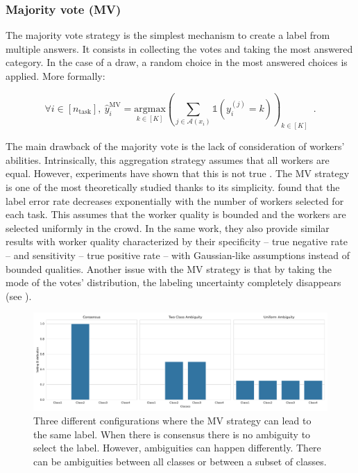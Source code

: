 \subsubsection{Majority vote (MV)}
\label{subsub:mv}

The majority vote strategy is the simplest mechanism to create a label from multiple answers.
It consists in collecting the votes and taking the most answered category.
In the case of a draw, a random choice in the most answered choices is applied.
More formally:

\begin{equation}\label{eq:mv}
    \forall i\in [n_\text{task}],\ \hat y_i^{\mathrm{MV}} = \underset{k\in[K]}{\mathrm{argmax}}\left(\sum_{j\in\mathcal{A}(x_i)} \mathds{1}(y_i^{(j)}=k)\right)_{k\in[K]} \enspace.
\end{equation}

The main drawback of the majority vote is the lack of consideration of workers' abilities.
Intrinsically, this aggregation strategy assumes that all workers are equal.
However, experiments have shown that this is not true \citep{snow_cheap_2008,vuurens2011much}.
The MV strategy is one of the most theoretically studied thanks to its simplicity.
\citet{wang2015crowdsourcing} found that the label error rate decreases exponentially with the number of workers selected for each task. This assumes that the worker quality is bounded and the workers are selected uniformly in the crowd.
In the same work, they also provide similar results with worker quality characterized by their specificity -- true negative rate -- and sensitivity -- true positive rate -- with Gaussian-like assumptions instead of bounded qualities.
Another issue with the MV strategy is that by taking the mode of the votes' distribution, the labeling uncertainty completely disappears (see ).

\begin{figure}[htb]
    \centering
    \includegraphics[width=.96\textwidth]{chapters/images/ambiguity.pdf}
    \caption{Three different configurations where the MV strategy can lead to the same label. When there is consensus there is no ambiguity to select the label. However, ambiguities can happen differently. There can be ambiguities between all classes or between a subset of classes.}
    \label{fig:confusion-types}
\end{figure}


